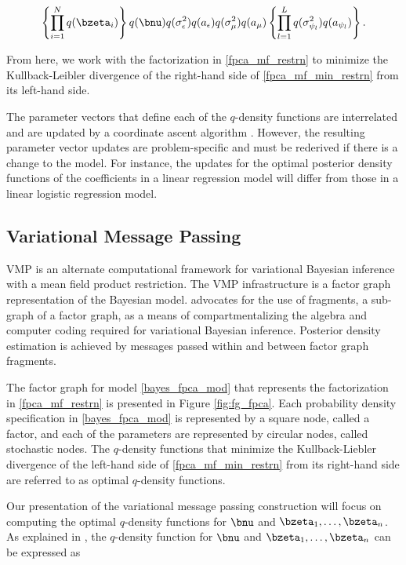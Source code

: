 \documentclass[ba]{imsart}
\numberwithin{equation}{section}
\theoremstyle{plain}
\def\sigsqeps{\sigma^2_{\epsilon}}
\def\aeps{a_{\epsilon}}
\def\sigsqmu{\sigma^2_{\mu}}
\def\amu{a_{\mu}}
\newcommand\sigsqpsi[1]{\sigma^2_{\psi_{#1}}}
\newcommand\apsi[1]{a_{\psi_{#1}}}
\begin{document}
\begin{equation}
	\left\{ \prod_{i=1}^N q (\bzeta_i) \right\} q (\bnu) q(\sigsqeps) q(\aeps)
	q(\sigsqmu) q (\amu) \left\{ \prod_{l=1}^L q(\sigsqpsi{l}) q(\apsi{l}) \right\}.
\label{fpca_mf_restrn}
\end{equation}

\noindent From here, we work with the factorization in \eqref{fpca_mf_restrn} to minimize the Kullback-Leibler
divergence  of the right-hand side of \eqref{fpca_mf_min_restrn} from its left-hand side.

The parameter vectors that define each of the $q$-density
functions are interrelated and are updated
by a coordinate ascent algorithm \cite[Algorithm~1]{ormerod10}. However, the resulting parameter vector updates
are problem-specific and must be rederived if there is a change to the model. For instance, the updates for the
optimal posterior density functions of the coefficients in a linear regression model will differ from those in a
linear logistic regression model.


\subsection{Variational Message Passing}
\label{sec:vmp}

VMP is an alternate computational framework for variational Bayesian inference with a mean field product restriction.
The VMP infrastructure is a factor graph representation of the Bayesian model. \citet{wand17} advocates for
the use of fragments, a sub-graph of a factor graph, as a means of compartmentalizing the algebra and computer
coding required for variational Bayesian inference. Posterior density estimation is achieved by messages passed
within and between factor graph fragments.

The factor graph for model \eqref{bayes_fpca_mod} that represents the factorization in \eqref{fpca_mf_restrn}
is presented in Figure \ref{fig:fg_fpca}. Each probability density specification in \eqref{bayes_fpca_mod} is
represented by a square node, called a factor, and each of the parameters are represented by circular nodes,
called stochastic nodes. The $q$-density functions that minimize the Kullback-Liebler divergence of
the left-hand side of \eqref{fpca_mf_min_restrn} from its right-hand side are referred to as optimal $q$-density
functions.

Our presentation of the variational message passing construction will focus on computing the optimal $q$-density
functions for $\bnu$ and $\bzeta_1, \dots, \bzeta_n$. As explained in \citet{minka05}, the $q$-density function for
$\bnu$ and $\bzeta_1, \dots, \bzeta_n$ can be expressed as
\end{document}
